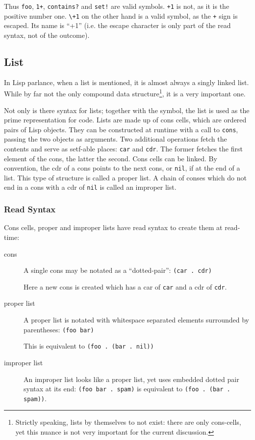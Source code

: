 \documentclass[a4paper,10pt,twoside]{report}
\newcommand{\sym}[1]{\texttt{#1}}
\newcommand{\fun}[1]{\texttt{#1}}
\begin{document}
Thus \sym{foo}, \sym{1+}, \sym{contains?} and \sym{set!} are valid symbols.
\sym{+1} is not, as it is the positive number one.  \sym{\textbackslash{}+1} on
the other hand is a valid symbol, as the \sym{+} sign is escaped.  Its name is
``+1'' (i.e. the escape character is only part of the read syntax, not of the
outcome). 

\subsection{List}
\label{subsubsec:list}

In Lisp parlance, when a list is mentioned, it is almost always a singly linked
list.  While by far not the only compound data structure\footnote{Strictly
  speaking, lists by themselves to not exist: there are only cons-cells, yet
  this nuance is not very important for the current discussion.}, it is a very
important one.

Not only is there syntax for lists; together with the symbol, the list is used
as the prime representation for code.  Lists are made up of cons cells, which
are ordered pairs of Lisp objects.  They can be constructed at runtime with a
call to \fun{cons}, passing the two objects as arguments.  Two additional
operations fetch the contents and serve as setf-able places: \fun{car} and
\fun{cdr}.  The former fetches the first element of the cons, the latter the
second.  Cons cells can be linked.  By convention, the cdr of a cons points to
the next cons, or \sym{nil}, if at the end of a list.  This type of structure is
called a proper list.  A chain of conses which do not end in a cons with a cdr
of \sym{nil} is called an improper list.

\subsubsection{Read Syntax}
\label{subsubsec:list-syntax}

Cons cells, proper and improper lists have read syntax to create them at
read-time:

\begin{description}
\item[cons] A single cons may be notated as a ``dotted-pair'': \texttt{(car
    . cdr)}

  Here a new cons is created which has a car of \sym{car} and a cdr of
  \sym{cdr}.
\item[proper list] A proper list is notated with whitespace separated elements
  surrounded by parentheses: \texttt{(foo bar)}

  This is equivalent to \texttt{(foo . (bar . nil))}
\item[improper list] An improper list looks like a proper list, yet uses
  embedded dotted pair syntax at its end: \texttt{(foo bar . spam)} is
  equivalent to \texttt{(foo . (bar . spam))}.
\end{description}
\end{document}
